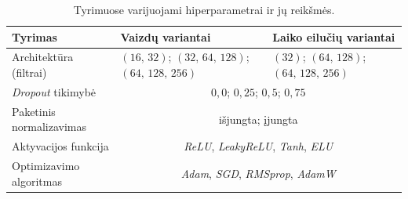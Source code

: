 \begin{table}[H]
    \centering
    \caption{Tyrimuose varijuojami hiperparametrai ir jų reikšmės.}
    \begin{tabular}{|l|l|l|}
        \hline
        Tyrimas & Vaizdų variantai & Laiko eilučių variantai \\
        \hline
        Architektūra (filtrai) & $(16,\,32)$; $(32,\,64,\,128)$; $(64,\,128,\,256)$ & $(32)$; $(64,\,128)$; $(64,\,128,\,256)$ \\ \hline
        \textit{Dropout} tikimybė & \multicolumn{2}{c|}{$0{,}0$; $0{,}25$; $0{,}5$; $0{,}75$} \\ \hline
        Paketinis normalizavimas & \multicolumn{2}{c|}{išjungta; įjungta} \\ \hline
        Aktyvacijos funkcija & \multicolumn{2}{c|}{\textit{ReLU}, \textit{LeakyReLU}, \textit{Tanh}, \textit{ELU}} \\ \hline
        Optimizavimo algoritmas & \multicolumn{2}{c|}{\textit{Adam}, \textit{SGD}, \textit{RMSprop}, \textit{AdamW}} \\ \hline
    \end{tabular}
    \label{tab:hiperparametrai_tyrimai}
\end{table}
